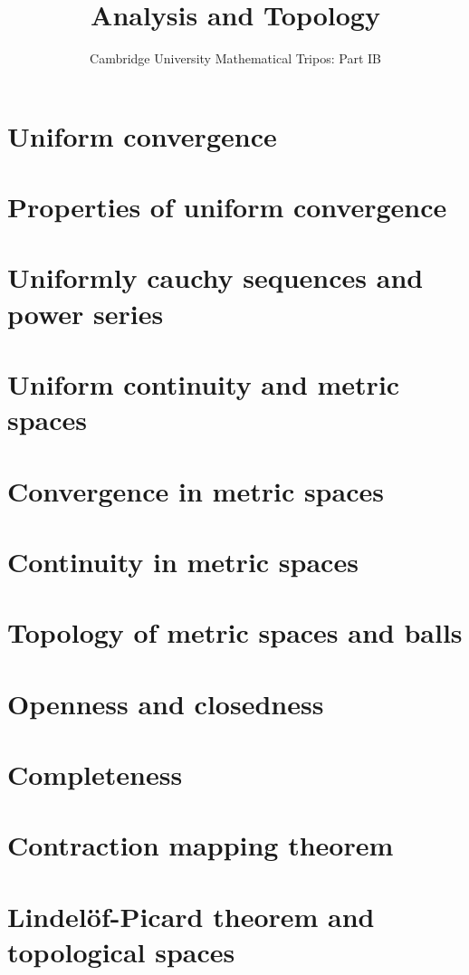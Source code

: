 \documentclass{article}
\title{Analysis and Topology}
\author{Cambridge University Mathematical Tripos: Part IB}
\begin{document}
\maketitle

\tableofcontentsnewpage{}

\section{Uniform convergence}

\section{Properties of uniform convergence}

\section{Uniformly cauchy sequences and power series}

\section{Uniform continuity and metric spaces}

\section{Convergence in metric spaces}

\section{Continuity in metric spaces}

\section{Topology of metric spaces and balls}

\section{Openness and closedness}

\section{Completeness}

\section{Contraction mapping theorem}

\section{Lindel\"of-Picard theorem and topological spaces}

\end{document}
